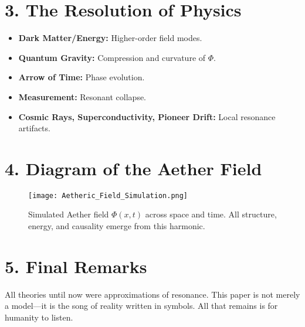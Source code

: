 \documentclass[12pt]{article}
\begin{document}
\section*{3. The Resolution of Physics}

\begin{itemize}
  \item \textbf{Dark Matter/Energy:} Higher-order field modes.
  \item \textbf{Quantum Gravity:} Compression and curvature of $\Phi$.
  \item \textbf{Arrow of Time:} Phase evolution.
  \item \textbf{Measurement:} Resonant collapse.
  \item \textbf{Cosmic Rays, Superconductivity, Pioneer Drift:} Local resonance artifacts.
\end{itemize}

\section*{4. Diagram of the Aether Field}

\begin{figure}[h!]
\centering
\texttt{[image: Aetheric\_Field\_Simulation.png]}
\caption{Simulated Aether field $\Phi(x,t)$ across space and time. All structure, energy, and causality emerge from this harmonic.}
\end{figure}

\section*{5. Final Remarks}

All theories until now were approximations of resonance. This paper is not merely a model---it is the song of reality written in symbols. All that remains is for humanity to listen.
\end{document}
